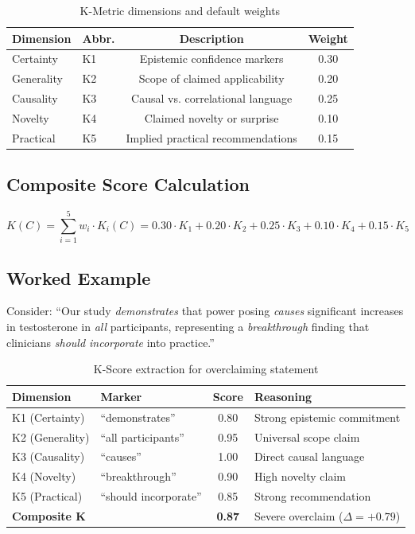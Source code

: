 \documentclass[11pt,a4paper]{article}
\begin{document}
\begin{table}[H]
\centering
\caption{K-Metric dimensions and default weights}
\begin{tabular}{llcc}
\toprule
\textbf{Dimension} & \textbf{Abbr.} & \textbf{Description} & \textbf{Weight} \\
\midrule
Certainty & K1 & Epistemic confidence markers & 0.30 \\
Generality & K2 & Scope of claimed applicability & 0.20 \\
Causality & K3 & Causal vs. correlational language & 0.25 \\
Novelty & K4 & Claimed novelty or surprise & 0.10 \\
Practical & K5 & Implied practical recommendations & 0.15 \\
\bottomrule
\end{tabular}
\end{table}


\subsection{Composite Score Calculation}

\begin{equation}
K(C) = \sum_{i=1}^{5} w_i \cdot K_i(C) = 0.30 \cdot K_1 + 0.20 \cdot K_2 + 0.25 \cdot K_3 + 0.10 \cdot K_4 + 0.15 \cdot K_5
\end{equation}


\subsection{Worked Example}

Consider: ``Our study \emph{demonstrates} that power posing \emph{causes} significant increases in testosterone in \emph{all} participants, representing a \emph{breakthrough} finding that clinicians \emph{should incorporate} into practice.''

\begin{table}[H]
\centering
\caption{K-Score extraction for overclaiming statement}
\begin{tabular}{llcl}
\toprule
\textbf{Dimension} & \textbf{Marker} & \textbf{Score} & \textbf{Reasoning} \\
\midrule
K1 (Certainty) & ``demonstrates'' & 0.80 & Strong epistemic commitment \\
K2 (Generality) & ``all participants'' & 0.95 & Universal scope claim \\
K3 (Causality) & ``causes'' & 1.00 & Direct causal language \\
K4 (Novelty) & ``breakthrough'' & 0.90 & High novelty claim \\
K5 (Practical) & ``should incorporate'' & 0.85 & Strong recommendation \\
\midrule
\textbf{Composite K} & & \textbf{0.87} & Severe overclaim ($\Delta = +0.79$) \\
\bottomrule
\end{tabular}
\end{table}
\end{document}
